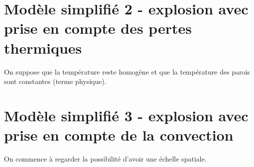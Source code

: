 \documentclass[10pt,a4paper,twocolumn]{article}
\begin{document}
\section{Modèle simplifié 2 - explosion avec prise en compte des pertes thermiques}

On suppose que la température reste homogène et que la température des parois sont constantes (terme physique).

\section{Modèle simplifié 3 - explosion avec prise en compte de la convection}
On commence à regarder la possibilité d'avoir une échelle spatiale.
\end{document}
